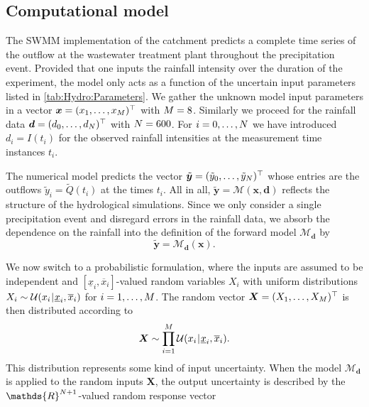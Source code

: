 \subsection{Computational model}
The SWMM implementation of the catchment predicts a complete time series of the outflow at the wastewater treatment plant throughout the precipitation event.
Provided that one inputs the rainfall intensity over the duration of the experiment, the model only acts as a function of the uncertain input parameters listed in \cref{tab:Hydro:Parameters}.
We gather the unknown model input parameters in a vector \(\bm{x} = (x_1,\ldots,x_M)^\top\) with \(M = 8\).
Similarly we proceed for the rainfall data \(\bm{d} = (d_0,\ldots,d_N)^\top\) with \(N = 600\).
For \(i=0,\ldots,N\) we have introduced \(d_i = I(t_i)\) for the observed rainfall intensities at the measurement time instances \(t_i\).
\par %
The numerical model predicts the vector \(\tilde{\bm{y}} = (\tilde{y}_0,\ldots,\tilde{y}_N)^\top\)
whose entries are the outflows \(\tilde{y}_i = \tilde{Q}(t_i)\) at the times \(t_i\).
All in all, \(\tilde{\bm{y}} = \mathcal{M}(\bm{x},\bm{d})\) reflects the structure of the hydrological simulations.
Since we only consider a single precipitation event and disregard errors in the rainfall data,
we absorb the dependence on the rainfall into the definition of the forward model \(\mathcal{M}_{\bm{d}}\) by
\begin{equation} \label{eq:Hydro:ForwardModel}
  \tilde{\bm{y}} = \mathcal{M}_{\bm{d}}(\bm{x}).
\end{equation}
\par %
We now switch to a probabilistic formulation,
where the inputs are assumed to be independent and \([\underline{x}_i,\overline{x}_i]\)-valued random variables \(X_i\)
with uniform distributions \(X_i \sim \mathcal{U}(x_i {\:\!}|{\:\!} \underline{x}_i,\overline{x}_i)\) for \(i=1,\ldots,M\).
The random vector \(\bm{X} = (X_1,\ldots,X_M)^\top\) is then distributed according to
\begin{equation} \label{eq:Hydro:InputRV}
  \bm{X} \sim \prod\limits_{i=1}^M \mathcal{U}(x_i {\:\!}|{\:\!} \underline{x}_i,\overline{x}_i).
\end{equation}
This distribution represents some kind of input uncertainty.
When the model \(\mathcal{M}_{\bm{d}}\) is applied to the random inputs \(\bm{X}\),
the output uncertainty is described by the \(\mathds{R}^{\dimData+1}\)-valued random response vector
